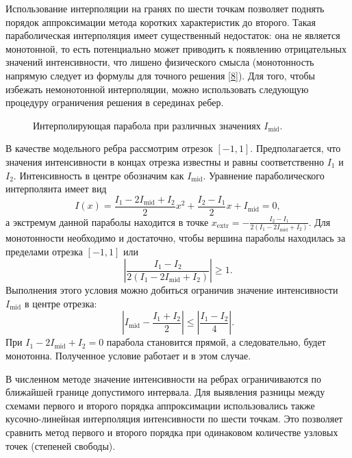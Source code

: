 Использование интерполяции на гранях по шести точкам позволяет поднять порядок аппроксимации метода коротких характеристик до второго. Такая параболическая интерполяция имеет существенный недостаток: она не является монотонной, то есть потенциально может приводить к появлению отрицательных значений интенсивности, что лишено физического смысла (монотонность напрямую следует из формулы для точного решения \eqref{8}). Для того, чтобы избежать немонотонной интерполяции, можно использовать следующую процедуру ограничения решения в серединах ребер. 
\begin{figure}[ht!]
	\caption{Интерполирующая парабола при различных значениях $I_\text{mid}$.}
	\label{fig:8}
\end{figure}

В качестве модельного ребра рассмотрим отрезок $[-1, 1]$. Предполагается, что значения интенсивности в концах отрезка известны и равны соответственно $I_1$ и $I_2$. Интенсивность в центре обозначим как $I_\text{mid}$. Уравнение параболического интерполянта имеет вид
\begin {equation}
I(x) = \frac{I_1 - 2I_\text{mid} + I_2}{2}x^2 + \frac{I_2 - I_1}{2} x + I_\text{mid} = 0, 
\end {equation}
а экстремум данной параболы находится в точке $x_{\text{extr}} = -\frac{I_2 - I_1}{2(I_1 - 2I_\text{mid} + I_2)}$.
Для монотонности необходимо и достаточно, чтобы вершина параболы находилась за пределами отрезка $[-1,1]$ или
\begin {equation}
\left| \frac{I_1 - I_2}{2(I_1 - 2I_\text{mid} + I_2)}\right| \geqslant 1.
\end {equation}
Выполнения этого условия можно добиться ограничив значение интенсивности $I_\text{mid}$ в центре отрезка:
\begin {equation}
\left| I_\text{mid} - \frac{I_1 + I_2}{2}\right| \leqslant \left| \frac{I_1 - I_2}{4}\right| .
\end {equation}
При $I_1 - 2I_\text{mid} + I_2 = 0$ парабола становится прямой, а следовательно, будет монотонна. Полученное условие работает и в этом случае.

В численном методе значение интенсивности на ребрах ограничиваются по ближайшей границе допустимого интервала. Для выявления разницы между схемами первого и второго порядка аппроксимации использовались также кусочно-линейная интерполяция интенсивности по шести точкам. Это позволяет сравнить метод первого и второго порядка при одинаковом количестве узловых точек (степеней свободы). 

